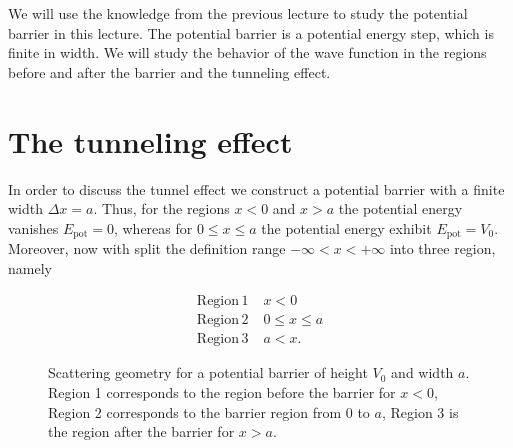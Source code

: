 \documentclass[
  a4paper,
]{book}
\begin{document}
We will use the knowledge from the previous lecture to study the
potential barrier in this lecture. The potential barrier is a potential
energy step, which is finite in width. We will study the behavior of the
wave function in the regions before and after the barrier and the
tunneling effect.

\section{The tunneling effect}\label{the-tunneling-effect}

In order to discuss the tunnel effect we construct a potential barrier
with a finite width \(\Delta x = a\). Thus, for the regions \(x < 0\)
and \(x > a\) the potential energy vanishes \(E_{\mathrm{pot}} = 0\),
whereas for \(0 \le x \le a\) the potential energy exhibit
\(E_{\mathrm{pot}} = V_0\). Moreover, now with split the definition
range \(-\infty < x < +\infty\) into three region, namely

\[
\begin{aligned}
\mathrm{Region \, 1} & \;  x < 0\\
\mathrm{Region \, 2} & \;  0 \le x \le a\\
\mathrm{Region \, 3} & \;  a < x \mathrm{.}
\end{aligned}
\]

\begin{figure}


\caption{\label{fig-potential_barrier}Scattering geometry for a
potential barrier of height \(V_0\) and width \(a\). Region 1
corresponds to the region before the barrier for \(x < 0\), Region 2
corresponds to the barrier region from \(0\) to \(a\), Region 3 is the
region after the barrier for \(x > a\).}

\end{figure}%
\end{document}
